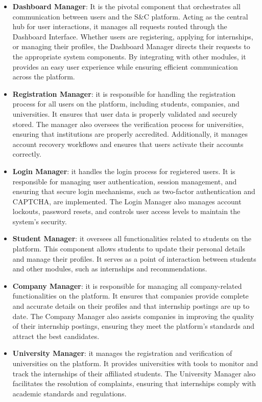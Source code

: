 \begin{itemize}
    \item \textbf{Dashboard Manager}: It is the pivotal component that orchestrates all communication between users and the S\&C platform. Acting as the central hub for user interactions, it manages all requests routed through the Dashboard Interface. Whether users are registering, applying for internships, or managing their profiles, the Dashboard Manager directs their requests to the appropriate system components. By integrating with other modules, it provides an easy user experience while ensuring efficient communication across the platform.
    \item \textbf{Registration Manager}: it is responsible for handling the registration process for all users on the platform, including students, companies, and universities. It ensures that user data is properly validated and securely stored. The manager also oversees the verification process for universities, ensuring that institutions are properly accredited. Additionally, it manages account recovery workflows and ensures that users activate their accounts correctly.
    \item \textbf{Login Manager}: it handles the login process for registered users. It is responsible for managing user authentication, session management, and ensuring that secure login mechanisms, such as two-factor authentication and CAPTCHA, are implemented. The Login Manager also manages account lockouts, password resets, and controls user access levels to maintain the system's security.
    \item \textbf{Student Manager}: it oversees all functionalities related to students on the platform. This component allows students to update their personal details and manage their profiles. It serves as a point of interaction between students and other modules, such as internships and recommendations. 
    \item \textbf{Company Manager}: it is responsible for managing all company-related functionalities on the platform. It ensures that companies provide complete and accurate details on their profiles and that internship postings are up to date. The Company Manager also assists companies in improving the quality of their internship postings, ensuring they meet the platform's standards and attract the best candidates.
    \item \textbf{University Manager}: it manages the registration and verification of universities on the platform. It provides universities with tools to monitor and track the internships of their affiliated students. The University Manager also facilitates the resolution of complaints, ensuring that internships comply with academic standards and regulations.

\end{itemize}
